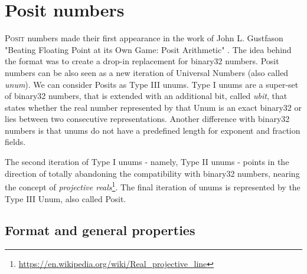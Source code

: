 \chapter{Posit numbers}\label{chap:posit_num}
\lettrine{P}{osit} numbers made their first appearance in the work of John L. Gustfason "Beating Floating Point at its Own Game: Posit Arithmetic" \cite{gustafson2017beating}. The idea behind the format was to create a drop-in replacement for binary32 numbers. Posit numbers can be also seen as a new iteration of Universal Numbers (also called \textit{unum}). We can consider Posits as Type III unums.
Type I unums are a super-set of binary32 numbers, that is extended with an additional bit, called \textit{ubit}, that states whether the real number represented by that Unum is an exact binary32 or lies between two consecutive representations. Another difference with binary32 numbers is that unums do not have a predefined length for exponent and fraction fields. 

The second iteration of Type I unums - namely, Type II unums - points in the direction of totally abandoning the compatibility with binary32 numbers, nearing the concept of \textit{projective reals}\footnote{\url{https://en.wikipedia.org/wiki/Real_projective_line}}. The final iteration of unums is represented by the Type III Unum, also called Posit.


\section{Format and general properties}

